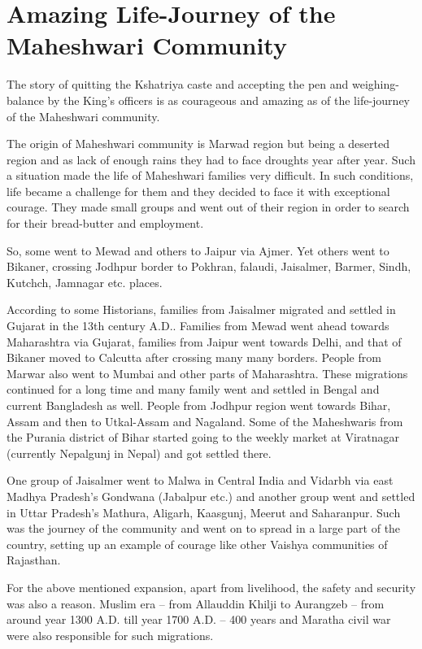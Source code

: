 \chapter{Amazing Life-Journey of the Maheshwari Community}
The story of quitting the Kshatriya caste and accepting the pen and weighing-balance by the King's officers is as courageous and amazing as of the life-journey of the Maheshwari community.

The origin of Maheshwari community is Marwad region but being a deserted region and as lack of enough rains they had to face droughts year after year. Such a situation made the life of Maheshwari families very difficult. In such conditions, life became a challenge for them and they decided to face it with exceptional courage. They made small groups and went out of their region in order to search for their bread-butter and employment.

So, some went to Mewad and others to Jaipur via Ajmer. Yet others went to Bikaner, crossing Jodhpur border to Pokhran, falaudi, Jaisalmer, Barmer, Sindh, Kutchch, Jamnagar etc. places.

According to some Historians, families from Jaisalmer migrated and settled in Gujarat in the 13th century A.D.. Families from Mewad went ahead towards Maharashtra via Gujarat, families from Jaipur went towards Delhi, and that of Bikaner moved to Calcutta after crossing many many borders. People from Marwar also went to Mumbai and other parts of Maharashtra. These migrations continued for a long time and many family went and settled in Bengal and current Bangladesh as well. People from Jodhpur region went towards Bihar, Assam and then to Utkal-Assam and Nagaland. Some of the Maheshwaris from the Purania district of Bihar started going to the weekly market at Viratnagar (currently Nepalgunj in Nepal) and got settled there.

One group of Jaisalmer went to Malwa in Central India and Vidarbh via east Madhya Pradesh's Gondwana (Jabalpur etc.) and another group went and settled in Uttar Pradesh's Mathura, Aligarh, Kaasgunj, Meerut and Saharanpur. Such was the journey of the community and went on to spread in a large part of the country, setting up an example of courage like other Vaishya communities of Rajasthan.

For the above mentioned expansion, apart from livelihood, the safety and security was also a reason. Muslim era -- from Allauddin Khilji to Aurangzeb -- from around year 1300 A.D. till year 1700 A.D. -- 400 years and Maratha civil war were also responsible for such migrations.

